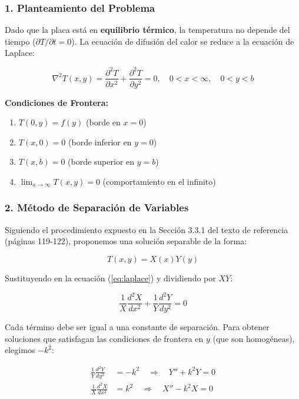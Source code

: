 \documentclass[a4paper]{article}
\begin{document}
\subsubsection{1. Planteamiento del Problema}

Dado que la placa está en \textbf{equilibrio térmico}, la temperatura no depende del tiempo ($\partial T/\partial t = 0$). La ecuación de difusión del calor se reduce a la ecuación de Laplace:

\begin{equation}
\nabla^2 T(x,y) = \frac{\partial^2 T}{\partial x^2} + \frac{\partial^2 T}{\partial y^2} = 0, \quad 0 < x < \infty, \quad 0 < y < b
\label{eq:laplace}
\end{equation}

\textbf{Condiciones de Frontera:}
\begin{enumerate}
    \item $T(0, y) = f(y)$ (borde en $x = 0$)
    \item $T(x, 0) = 0$ (borde inferior en $y = 0$)
    \item $T(x, b) = 0$ (borde superior en $y = b$)
    \item $\lim_{x \to \infty} T(x, y) = 0$ (comportamiento en el infinito)
\end{enumerate}

\subsubsection{2. Método de Separación de Variables}

Siguiendo el procedimiento expuesto en la Sección 3.3.1 del texto de referencia (páginas 119-122), proponemos una solución separable de la forma:

\begin{equation}
T(x, y) = X(x)Y(y)
\end{equation}

Sustituyendo en la ecuación (\ref{eq:laplace}) y dividiendo por $XY$:

\begin{equation}
\frac{1}{X}\frac{d^2X}{dx^2} + \frac{1}{Y}\frac{d^2Y}{dy^2} = 0
\end{equation}

Cada término debe ser igual a una constante de separación. Para obtener soluciones que satisfagan las condiciones de frontera en $y$ (que son homogéneas), elegimos $-k^2$:

\begin{align}
\frac{1}{Y}\frac{d^2Y}{dy^2} &= -k^2 \quad \Rightarrow \quad Y'' + k^2 Y = 0 \label{eq:Y_ode} \\
\frac{1}{X}\frac{d^2X}{dx^2} &= k^2 \quad \Rightarrow \quad X'' - k^2 X = 0 \label{eq:X_ode}
\end{align}
\end{document}
